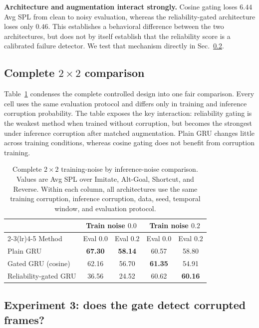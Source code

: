 \documentclass[conference]{IEEEtran}
\begin{document}
\textbf{Architecture and augmentation interact strongly.} Cosine gating loses $6.44$ Avg SPL from clean to noisy evaluation, whereas the reliability-gated architecture loses only $0.46$. This establishes a behavioral difference between the two architectures, but does not by itself establish that the reliability score is a calibrated failure detector. We test that mechanism directly in Sec.~\ref{sec:gate_analysis}.

\subsection{Complete $2{\times}2$ comparison}
\label{sec:two_by_two}

Table~\ref{tab:two_by_two} condenses the complete controlled design into one
fair comparison. Every cell uses the same evaluation protocol and differs only
in training and inference corruption probability. The table exposes the key
interaction: reliability gating is the weakest method when trained without
corruption, but becomes the strongest under inference corruption after
matched augmentation. Plain GRU changes little across training conditions,
whereas cosine gating does not benefit from corruption training.

\begin{table}[t]
\centering
\caption{Complete $2{\times}2$ training-noise by inference-noise comparison.
Values are Avg SPL over Imitate, Alt-Goal, Shortcut, and Reverse. Within each
column, all architectures use the same training corruption, inference
corruption, data, seed, temporal window, and evaluation protocol.}
\label{tab:two_by_two}
\small
\setlength{\tabcolsep}{10pt}
\begin{tabular}{lcc cc}
\toprule
& \multicolumn{2}{c}{Train noise $0.0$}
& \multicolumn{2}{c}{Train noise $0.2$} \\
\cmidrule(lr){2-3}\cmidrule(lr){4-5}
Method & Eval $0.0$ & Eval $0.2$ & Eval $0.0$ & Eval $0.2$ \\
\midrule
Plain GRU             & \textbf{67.30} & \textbf{58.14} & 60.57 & 58.80 \\
Gated GRU (cosine)    & 62.16 & 56.70 & \textbf{61.35} & 54.91 \\
Reliability-gated GRU & 36.56 & 24.52 & 60.62 & \textbf{60.16} \\
\bottomrule
\end{tabular}
\end{table}

\subsection{Experiment 3: does the gate detect corrupted frames?}
\label{sec:gate_analysis}
\end{document}
